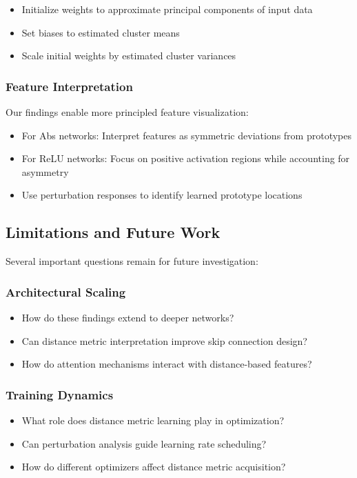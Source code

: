 \begin{itemize}
    \item Initialize weights to approximate principal components of input data
    \item Set biases to estimated cluster means
    \item Scale initial weights by estimated cluster variances
\end{itemize}

\subsubsection{Feature Interpretation}
Our findings enable more principled feature visualization:

\begin{itemize}
    \item For Abs networks: Interpret features as symmetric deviations from prototypes
    \item For ReLU networks: Focus on positive activation regions while accounting for asymmetry
    \item Use perturbation responses to identify learned prototype locations
\end{itemize}

\subsection{Limitations and Future Work}

Several important questions remain for future investigation:

\subsubsection{Architectural Scaling}
\begin{itemize}
    \item How do these findings extend to deeper networks?
    \item Can distance metric interpretation improve skip connection design?
    \item How do attention mechanisms interact with distance-based features?
\end{itemize}

\subsubsection{Training Dynamics}
\begin{itemize}
    \item What role does distance metric learning play in optimization?
    \item Can perturbation analysis guide learning rate scheduling?
    \item How do different optimizers affect distance metric acquisition?
\end{itemize}

